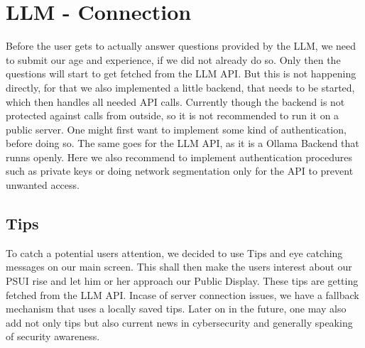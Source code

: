 \section{LLM - Connection}
Before the user gets to actually answer questions provided by the LLM, we need to submit our age and experience, if we did not already do so.
Only then the questions will start to get fetched from the LLM API.
But this is not happening directly, for that we also implemented a little backend, that needs to be started, which then handles all needed API calls.
Currently though the backend is not protected against calls from outside, so it is not recommended to run it on a public server.
One might first want to implement some kind of authentication, before doing so. 
The same goes for the LLM API, as it is a Ollama Backend that runns openly.
Here we also recommend to implement authentication procedures such as private keys or doing network segmentation only for the API to prevent unwanted access.

\subsection{Tips}
To catch a potential users attention, we decided to use Tips and eye catching messages on our main screen.
This shall then make the users interest about our PSUI rise and let him or her approach our Public Display.
These tips are getting fetched from the LLM API.
Incase of server connection issues, we have a fallback mechanism that uses a locally saved tips.
Later on in the future, one may also add not only tips but also current news in cybersecurity and generally speaking of security awareness.

